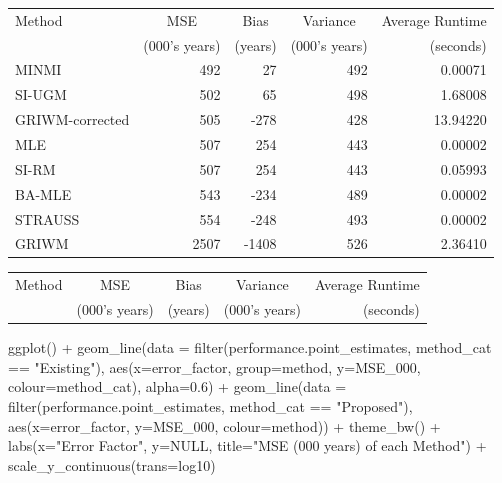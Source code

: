 \documentclass[
]{article}
\newenvironment{Shaded}{\begin{snugshade}}{\end{snugshade}}
\newcommand{\AttributeTok}[1]{\textcolor[rgb]{0.77,0.63,0.00}{#1}}
\newcommand{\ConstantTok}[1]{\textcolor[rgb]{0.00,0.00,0.00}{#1}}
\newcommand{\FloatTok}[1]{\textcolor[rgb]{0.00,0.00,0.81}{#1}}
\newcommand{\FunctionTok}[1]{\textcolor[rgb]{0.00,0.00,0.00}{#1}}
\newcommand{\NormalTok}[1]{#1}
\newcommand{\SpecialCharTok}[1]{\textcolor[rgb]{0.00,0.00,0.00}{#1}}
\newcommand{\StringTok}[1]{\textcolor[rgb]{0.31,0.60,0.02}{#1}}
\begin{document}
\begin{tabular}{lrrrr}
\toprule
\multicolumn{1}{l}{Method} & \multicolumn{1}{c}{MSE} & \multicolumn{1}{c}{Bias} & \multicolumn{1}{c}{Variance} & \multicolumn{1}{c}{Average Runtime} \\
 & (000's years) & (years) & (000's years) & (seconds)\\
\midrule
MINMI & 492 & 27 & 492 & 0.00071\\
SI-UGM & 502 & 65 & 498 & 1.68008\\
GRIWM-corrected & 505 & -278 & 428 & 13.94220\\
MLE & 507 & 254 & 443 & 0.00002\\
SI-RM & 507 & 254 & 443 & 0.05993\\
\addlinespace
BA-MLE & 543 & -234 & 489 & 0.00002\\
STRAUSS & 554 & -248 & 493 & 0.00002\\
GRIWM & 2507 & -1408 & 526 & 2.36410\\
\bottomrule
\end{tabular}

\begin{tabular}{lrrrr}
\toprule
\multicolumn{1}{l}{Method} & \multicolumn{1}{c}{MSE} & \multicolumn{1}{c}{Bias} & \multicolumn{1}{c}{Variance} & \multicolumn{1}{c}{Average Runtime} \\
 & (000's years) & (years) & (000's years) & (seconds)\\


\bottomrule
\end{tabular}

\begin{Shaded}
\begin{Highlighting}[]
\FunctionTok{ggplot}\NormalTok{() }\SpecialCharTok{+}
  \FunctionTok{geom\_line}\NormalTok{(}\AttributeTok{data =} \FunctionTok{filter}\NormalTok{(performance.point\_estimates, method\_cat }\SpecialCharTok{==} \StringTok{"Existing"}\NormalTok{),}
            \FunctionTok{aes}\NormalTok{(}\AttributeTok{x=}\NormalTok{error\_factor, }\AttributeTok{group=}\NormalTok{method, }\AttributeTok{y=}\NormalTok{MSE\_000, }\AttributeTok{colour=}\NormalTok{method\_cat), }\AttributeTok{alpha=}\FloatTok{0.6}\NormalTok{) }\SpecialCharTok{+}
  \FunctionTok{geom\_line}\NormalTok{(}\AttributeTok{data =} \FunctionTok{filter}\NormalTok{(performance.point\_estimates, method\_cat }\SpecialCharTok{==} \StringTok{"Proposed"}\NormalTok{),}
            \FunctionTok{aes}\NormalTok{(}\AttributeTok{x=}\NormalTok{error\_factor, }\AttributeTok{y=}\NormalTok{MSE\_000, }\AttributeTok{colour=}\NormalTok{method)) }\SpecialCharTok{+}
  \FunctionTok{theme\_bw}\NormalTok{() }\SpecialCharTok{+}
  \FunctionTok{labs}\NormalTok{(}\AttributeTok{x=}\StringTok{"Error Factor"}\NormalTok{, }\AttributeTok{y=}\ConstantTok{NULL}\NormalTok{, }\AttributeTok{title=}\StringTok{"MSE (\textquotesingle{}000 years) of each Method"}\NormalTok{) }\SpecialCharTok{+}
  \FunctionTok{scale\_y\_continuous}\NormalTok{(}\AttributeTok{trans=}\StringTok{\textquotesingle{}log10\textquotesingle{}}\NormalTok{)}
\end{Highlighting}
\end{Shaded}
\end{document}
